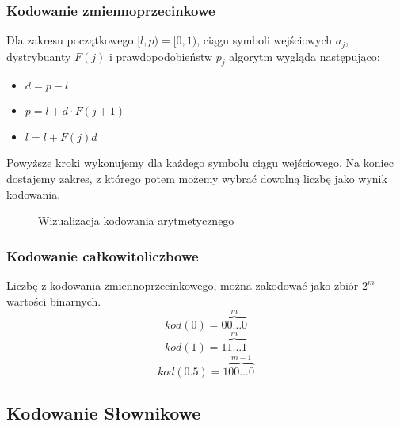 \documentclass{../notatki}
\begin{document}
\subsubsection{Kodowanie zmiennoprzecinkowe}

Dla zakresu początkowego $[l, p)=[0, 1)$, ciągu symboli wejściowych $a_j$,
dystrybuanty $F(j)$ i prawdopodobieństw $p_j$ algorytm wygląda następująco:
\begin{itemize}
  \item $d = p - l$
  \item $p = l + d \cdot F(j + 1)$
  \item $l = l + F(j)d$
\end{itemize}
Powyższe kroki wykonujemy dla każdego symbolu ciągu wejściowego. Na koniec
dostajemy zakres, z którego potem możemy wybrać dowolną liczbę jako wynik
kodowania.

\begin{figure}[h]
  \centering
  \caption{Wizualizacja kodowania arytmetycznego}
\end{figure}

\subsubsection{Kodowanie całkowitoliczbowe}

Liczbę z kodowania zmiennoprzecinkowego, można zakodować jako zbiór $2^m$
wartości binarnych.
$$
kod(0) = \stackrel{m}{\overbrace{00 \dots 0}}
$$
$$
kod(1) = \stackrel{m}{\overbrace{11 \dots 1}}
$$
$$
kod(0.5) = 1\stackrel{m-1}{\overbrace{00 \dots 0}}
$$

\subsection{Kodowanie Słownikowe}
\end{document}
